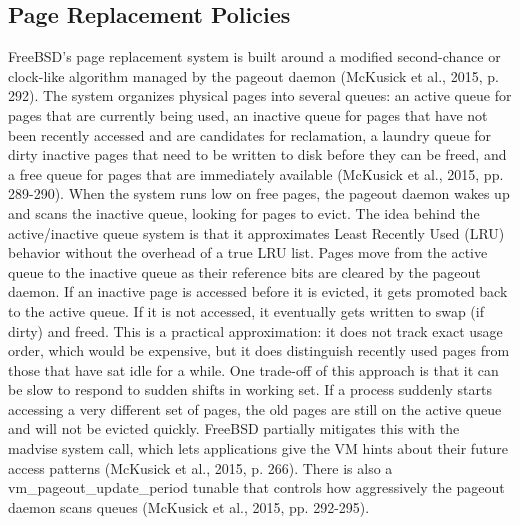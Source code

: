 \subsection{Page Replacement Policies}
FreeBSD's page replacement system is built around a modified second-chance or clock-like algorithm managed by the pageout daemon (McKusick et al., 2015, p. 292). The system organizes physical pages into several queues: an active queue for pages that are currently being used, an inactive queue for pages that have not been recently accessed and are candidates for reclamation, a laundry queue for dirty inactive pages that need to be written to disk before they can be freed, and a free queue for pages that are immediately available (McKusick et al., 2015, pp. 289-290). When the system runs low on free pages, the pageout daemon wakes up and scans the inactive queue, looking for pages to evict.
The idea behind the active/inactive queue system is that it approximates Least Recently Used (LRU) behavior without the overhead of a true LRU list. Pages move from the active queue to the inactive queue as their reference bits are cleared by the pageout daemon. If an inactive page is accessed before it is evicted, it gets promoted back to the active queue. If it is not accessed, it eventually gets written to swap (if dirty) and freed. This is a practical approximation: it does not track exact usage order, which would be expensive, but it does distinguish recently used pages from those that have sat idle for a while.
One trade-off of this approach is that it can be slow to respond to sudden shifts in working set. If a process suddenly starts accessing a very different set of pages, the old pages are still on the active queue and will not be evicted quickly. FreeBSD partially mitigates this with the madvise system call, which lets applications give the VM hints about their future access patterns (McKusick et al., 2015, p. 266). There is also a vm\_pageout\_update\_period tunable that controls how aggressively the pageout daemon scans queues (McKusick et al., 2015, pp. 292-295).

